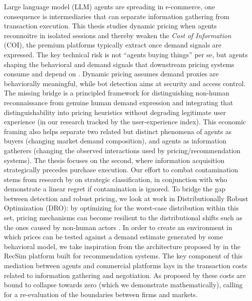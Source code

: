 \documentclass[10pt,letterpaper]{article}
\begin{document}
Large language model (LLM) agents are spreading in e-commerce, one consequence is intermediaries that can separate information gathering from transaction execution.
This thesis studies dynamic pricing when agents reconnoitre in isolated sessions and thereby weaken the \emph{Cost of Information} (COI), the premium platforms typically extract once demand signals are expressed.
The key technical risk is not ``agents buying things'' per se, but agents shaping the behavioral and demand signals that downstream pricing systems consume and depend on \parencite{xia_evaluation-driven_2025}.
Dynamic pricing assumes demand proxies are behaviorally meaningful, while bot detection aims at security and access control.
The missing bridge is a principled framework for distinguishing non-human reconnaissance from genuine human demand expression and integrating that distinguishability into pricing heuristics without degrading legitimate user experience (in our research tracked by the user-experience index).
This economic framing also helps separate two related but distinct phenomena of agents as buyers (changing market demand composition), and agents as information gatherers (changing the observed interactions used by pricing/recommendation systems).
The thesis focuses on the second, where information acquisition strategically precedes purchase execution.
Our effort to combat contamination stems from research by \textcite{hardt_strategic_2015} on strategic classification, in conjunction with \textcite{liu_contextual_2024} who demonstrate a linear regret if contamination is ignored.
To bridge the gap between detection and robust pricing, we look at work in Distributionally Robust Optimization (DRO): by optimizing for the worst-case distribution within this set, pricing mechanisms can become resilient to the distributional shifts such as the ones caused by non-human actors \parencite{kuhn_wasserstein_2024}.
In order to create an environment in which prices can be tested against a demand estimate generated by some behavioral model, we take inspiration from the architecture proposed by \textcite{ie_recsim_2019} in the RecSim platform built for recommendation systems.
The key component of this mediation between agents and commercial platforms lays in the transaction costs related to information gathering and negotiation.
As proposed by \textcite{shahidi_coasean_2025} these costs are bound to collapse towards zero (which we demonstrate mathematically), calling for a re-evaluation of the boundaries between firms and markets.
\end{document}
